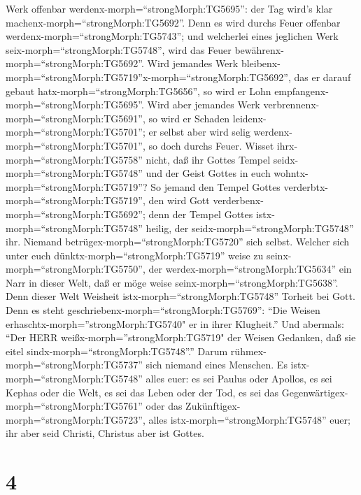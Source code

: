 Werk offenbar werdenx-morph=``strongMorph:TG5695'': der Tag wird's klar
machenx-morph=``strongMorph:TG5692''. Denn es wird durchs Feuer offenbar
werdenx-morph=``strongMorph:TG5743''; und welcherlei eines jeglichen
Werk seix-morph=``strongMorph:TG5748'', wird das Feuer
bewährenx-morph=``strongMorph:TG5692''.  Wird jemandes Werk
bleibenx-morph=``strongMorph:TG5719''\textbar x-morph=``strongMorph:TG5692'',
das er darauf gebaut hatx-morph=``strongMorph:TG5656'', so wird er Lohn
empfangenx-morph=``strongMorph:TG5695''.  Wird aber
jemandes Werk verbrennenx-morph=``strongMorph:TG5691'', so wird er
Schaden leidenx-morph=``strongMorph:TG5701''; er selbst aber wird selig
werdenx-morph=``strongMorph:TG5701'', so doch durchs Feuer.
 Wisset ihrx-morph=``strongMorph:TG5758'' nicht, daß ihr
Gottes Tempel seidx-morph=``strongMorph:TG5748'' und der Geist Gottes in
euch wohntx-morph=``strongMorph:TG5719''?  So jemand den
Tempel Gottes verderbtx-morph=``strongMorph:TG5719'', den wird Gott
verderbenx-morph=``strongMorph:TG5692''; denn der Tempel Gottes
istx-morph=``strongMorph:TG5748'' heilig, der
seidx-morph=``strongMorph:TG5748'' ihr.  Niemand
betrügex-morph=``strongMorph:TG5720'' sich selbst. Welcher sich unter
euch dünktx-morph=``strongMorph:TG5719'' weise zu
seinx-morph=``strongMorph:TG5750'', der
werdex-morph=``strongMorph:TG5634'' ein Narr in dieser Welt, daß er möge
weise seinx-morph=``strongMorph:TG5638''.  Denn dieser Welt
Weisheit istx-morph=``strongMorph:TG5748'' Torheit bei Gott. Denn es
steht geschriebenx-morph=``strongMorph:TG5769'': ``Die Weisen
erhaschtx-morph=''strongMorph:TG5740" er in ihrer Klugheit.''
 Und abermals: ``Der HERR weißx-morph=''strongMorph:TG5719"
der Weisen Gedanken, daß sie eitel sindx-morph=``strongMorph:TG5748''.''
 Darum rühmex-morph=``strongMorph:TG5737'' sich niemand
eines Menschen. Es istx-morph=``strongMorph:TG5748'' alles euer:
 es sei Paulus oder Apollos, es sei Kephas oder die Welt,
es sei das Leben oder der Tod, es sei das
Gegenwärtigex-morph=``strongMorph:TG5761'' oder das
Zukünftigex-morph=``strongMorph:TG5723'', alles
istx-morph=``strongMorph:TG5748'' euer;  ihr aber seid
Christi, Christus aber ist Gottes.

\hypertarget{section-3}{%
\section{4}\label{section-3}}

